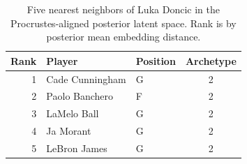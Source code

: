 \begin{table}[htbp]
  \centering\small
  \begin{tabular}{rllc}
    \toprule
    Rank & Player & Position & Archetype \\
    \midrule
    1 & Cade Cunningham & G & 2 \\
    2 & Paolo Banchero & F & 2 \\
    3 & LaMelo Ball & G & 2 \\
    4 & Ja Morant & G & 2 \\
    5 & LeBron James & G & 2 \\
    \bottomrule
  \end{tabular}
  \caption{Five nearest neighbors of Luka Doncic in the Procrustes-aligned posterior latent space. Rank is by posterior mean embedding distance.}
  \label{tab:Luka_Doncic_neighbors}
\end{table}


